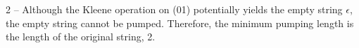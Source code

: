 2 -- Although the Kleene operation on (01) potentially yields the empty string $\epsilon$, the empty string cannot be pumped. Therefore, the minimum pumping length is the length of the original string, 2.